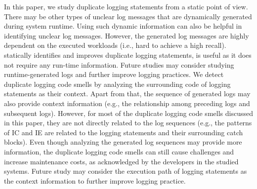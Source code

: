 

In this paper, we study duplicate logging statements from a static point of view. There may be other types of unclear log messages that are dynamically generated during system runtime. Using such dynamic information can also be helpful in identifying unclear log messages. However, the generated log messages are highly dependent on the executed workloads (i.e., hard to achieve a high recall). \toolS statically identifies and improves duplicate logging statements, is useful as it does not require any run-time information. Future studies may consider studying runtime-generated logs and further improve logging practices. 
We detect duplicate logging code smells by analyzing the surrounding code of logging statements as their context. Apart from that, the sequence of generated logs may also provide context information (e.g., the relationship among preceding logs and subsequent logs). However, for most of the duplicate logging code smells discussed in this paper, they are not directly related to the log sequences (e.g., the patterns of IC and IE are related to the logging statements and their surrounding catch blocks). Even though analyzing the generated log sequences may provide more information, the duplicate logging code smells can still cause challenges and increase maintenance costs, as acknowledged by the developers in the studied systems. Future study may consider the execution path of logging statements as the context information to further improve logging practice.




